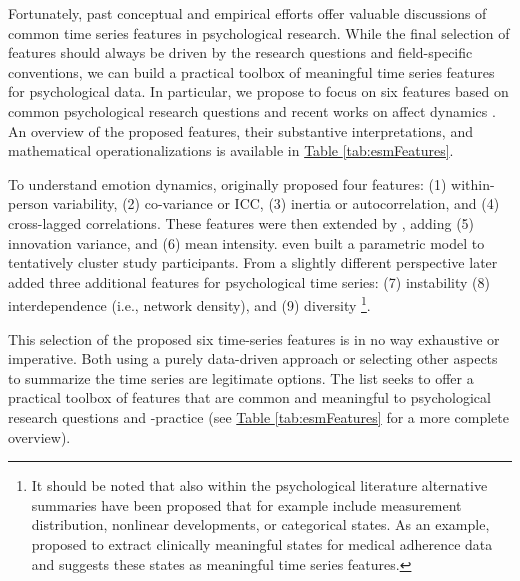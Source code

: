 \documentclass[man, 12pt, a4paper, mask, floatsintext]{apa7}
\theoremstyle{break}
\theoremstyle{plain}
\newcommand{\tblref}[2][]{\hyperref[#2]{Table \ref*{#2}#1}}
\begin{document}
Fortunately, past conceptual and empirical efforts offer valuable discussions of common time series features in psychological research. While the final selection of features should always be driven by the research questions and field-specific conventions, we can build a practical toolbox of meaningful time series features for psychological data. In particular, we propose to focus on six features based on common psychological research questions and recent works on affect dynamics \citep[e.g.,][]{dejonckheere2019, kuppens2017, adya2001}. An overview of the proposed features, their substantive interpretations, and mathematical operationalizations is available in \tblref{tab:esmFeatures}.

To understand emotion dynamics, \citet{kuppens2017} originally proposed four features: (1) within-person variability, (2) co-variance or ICC, (3) inertia or autocorrelation, and (4) cross-lagged correlations. These features were then extended by \citet{krone2018}, adding (5) innovation variance, and (6) mean intensity. \citet{krone2018} even built a parametric model to tentatively cluster study participants. From a slightly different perspective \citet{dejonckheere2019} later added three additional features for psychological time series: (7) instability (8) interdependence (i.e., network density), and (9) diversity \citep[i.e., Gini coefficient; also see][]{wendt2020}\footnote{It should be noted that also within the psychological literature alternative summaries have been proposed that for example include measurement distribution, nonlinear developments, or categorical states. As an example, \citet{kiwuwa-muyingo2011} proposed to extract clinically meaningful states for medical adherence data and suggests these states as meaningful time series features.}. 






This selection of the proposed six time-series features is in no way exhaustive or imperative. Both using a purely data-driven approach or selecting other aspects to summarize the time series are legitimate options. The list seeks to offer a practical toolbox of features that are common and meaningful to psychological research questions and -practice (see \tblref{tab:esmFeatures} for a more complete overview).
\end{document}

